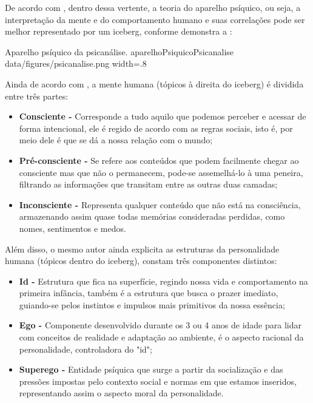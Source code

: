 De acordo com , dentro dessa vertente, a teoria do aparelho psíquico, ou seja, a interpretação da mente e do comportamento humano e suas correlações pode ser melhor representado por um iceberg, conforme demonstra a :

\image
    {Aparelho psíquico da psicanálise.}
    {aparelhoPsiquicoPsicanalise}
    {data/figures/psicanalise.png}
    {width=.8\textwidth}
    {}

Ainda de acordo com , a mente humana (tópicos à direita do iceberg) é dividida entre três partes:
\begin{itemize}
    \item \textbf{Consciente -} Corresponde a tudo aquilo que podemos perceber e acessar de forma intencional, ele é regido de acordo com as regras sociais, isto é, por meio dele é que se dá a nossa relação com o mundo;
    \item \textbf{Pré-consciente -} Se refere aos conteúdos que podem facilmente chegar ao consciente mas que não o permanecem, pode-se assemelhá-lo à uma peneira, filtrando as informações que transitam entre as outras duas camadas;
    \item \textbf{Inconsciente -} Representa qualquer conteúdo que não está na consciência, armazenando assim quase todas memórias consideradas perdidas, como nomes, sentimentos e medos.
\end{itemize}

Além disso, o mesmo autor ainda explicita as estruturas da personalidade humana (tópicos dentro do iceberg), constam três componentes distintos:
\begin{itemize}
    \item \textbf{Id -} Estrutura que fica na superfície, regindo nossa vida e comportamento na primeira infância, também é a estrutura que busca o prazer imediato, guiando-se pelos instintos e impulsos mais primitivos da nossa essência;
    \item \textbf{Ego -} Componente desenvolvido durante os 3 ou 4 anos de idade para lidar com conceitos de realidade e adaptação ao ambiente, é o aspecto racional da personalidade, controladora do "id";
    \item \textbf{Superego - } Entidade psíquica que surge a partir da socialização e das pressões impostas pelo contexto social e normas em que estamos inseridos, representando assim o aspecto moral da personalidade. 
\end{itemize}

